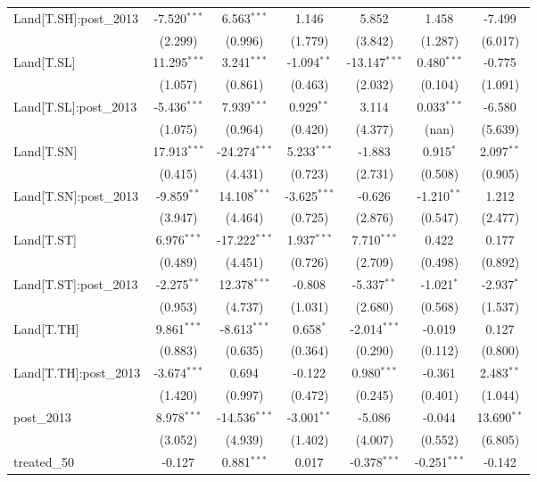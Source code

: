 \begin{table}[!htbp]
\begin{tabular}{@{\extracolsep{5pt}}lcccccc}
 Land[T.SH]:post_2013 & -7.520$^{***}$ & 6.563$^{***}$ & 1.146$^{}$ & 5.852$^{}$ & 1.458$^{}$ & -7.499$^{}$ \\
  & (2.299) & (0.996) & (1.779) & (3.842) & (1.287) & (6.017) \\
 Land[T.SL] & 11.295$^{***}$ & 3.241$^{***}$ & -1.094$^{**}$ & -13.147$^{***}$ & 0.480$^{***}$ & -0.775$^{}$ \\
  & (1.057) & (0.861) & (0.463) & (2.032) & (0.104) & (1.091) \\
 Land[T.SL]:post_2013 & -5.436$^{***}$ & 7.939$^{***}$ & 0.929$^{**}$ & 3.114$^{}$ & 0.033$^{***}$ & -6.580$^{}$ \\
  & (1.075) & (0.964) & (0.420) & (4.377) & (nan) & (5.639) \\
 Land[T.SN] & 17.913$^{***}$ & -24.274$^{***}$ & 5.233$^{***}$ & -1.883$^{}$ & 0.915$^{*}$ & 2.097$^{**}$ \\
  & (0.415) & (4.431) & (0.723) & (2.731) & (0.508) & (0.905) \\
 Land[T.SN]:post_2013 & -9.859$^{**}$ & 14.108$^{***}$ & -3.625$^{***}$ & -0.626$^{}$ & -1.210$^{**}$ & 1.212$^{}$ \\
  & (3.947) & (4.464) & (0.725) & (2.876) & (0.547) & (2.477) \\
 Land[T.ST] & 6.976$^{***}$ & -17.222$^{***}$ & 1.937$^{***}$ & 7.710$^{***}$ & 0.422$^{}$ & 0.177$^{}$ \\
  & (0.489) & (4.451) & (0.726) & (2.709) & (0.498) & (0.892) \\
 Land[T.ST]:post_2013 & -2.275$^{**}$ & 12.378$^{***}$ & -0.808$^{}$ & -5.337$^{**}$ & -1.021$^{*}$ & -2.937$^{*}$ \\
  & (0.953) & (4.737) & (1.031) & (2.680) & (0.568) & (1.537) \\
 Land[T.TH] & 9.861$^{***}$ & -8.613$^{***}$ & 0.658$^{*}$ & -2.014$^{***}$ & -0.019$^{}$ & 0.127$^{}$ \\
  & (0.883) & (0.635) & (0.364) & (0.290) & (0.112) & (0.800) \\
 Land[T.TH]:post_2013 & -3.674$^{***}$ & 0.694$^{}$ & -0.122$^{}$ & 0.980$^{***}$ & -0.361$^{}$ & 2.483$^{**}$ \\
  & (1.420) & (0.997) & (0.472) & (0.245) & (0.401) & (1.044) \\
 post_2013 & 8.978$^{***}$ & -14.536$^{***}$ & -3.001$^{**}$ & -5.086$^{}$ & -0.044$^{}$ & 13.690$^{**}$ \\
  & (3.052) & (4.939) & (1.402) & (4.007) & (0.552) & (6.805) \\
 treated_50 & -0.127$^{}$ & 0.881$^{***}$ & 0.017$^{}$ & -0.378$^{***}$ & -0.251$^{***}$ & -0.142$^{}$ \\

\end{tabular}
\end{table}
